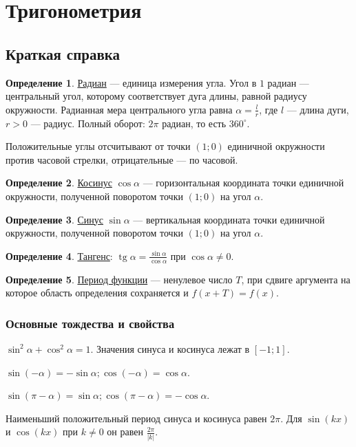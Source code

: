 \documentclass[12pt,a4paper]{article}
\theoremstyle{definition}
\newtheorem{definition}{Определение}[section]
\theoremstyle{plain}
\theoremstyle{remark}
\newcommand{\term}[1]{\uline{#1}}
\begin{document}
\section{Тригонометрия}
\subsection*{Краткая справка}
\begin{definition}\term{Радиан} — единица измерения угла. Угол в \(1\) радиан — центральный угол, которому соответствует дуга длины, равной радиусу окружности. Радианная мера центрального угла равна \(\alpha=\frac{l}{r}\), где \(l\) — длина дуги, \(r>0\) — радиус. Полный оборот: \(2\pi\) радиан, то есть \(360^\circ\).\end{definition}
Положительные углы отсчитывают от точки \((1;0)\) единичной окружности против часовой стрелки, отрицательные — по часовой.
\begin{definition}\term{Косинус} \(\cos\alpha\) — горизонтальная координата точки единичной окружности, полученной поворотом точки \((1;0)\) на угол \(\alpha\).\end{definition}
\begin{definition}\term{Синус} \(\sin\alpha\) — вертикальная координата точки единичной окружности, полученной поворотом точки \((1;0)\) на угол \(\alpha\).\end{definition}
\begin{definition}\term{Тангенс}: \(\operatorname{tg}  \alpha  = \frac{\sin  \alpha }{\cos  \alpha }\) при \(\cos  \alpha  \ne  0\).\end{definition}
\begin{definition}\term{Период функции} — ненулевое число \(T\), при сдвиге аргумента на которое область определения сохраняется и \(f (x + T) = f (x)\).\end{definition}
\subsubsection*{Основные тождества и свойства}
\(\sin ^{2} \alpha  + \cos ^{2} \alpha  = 1\). Значения синуса и косинуса лежат в \([- 1;\allowbreak 1]\).\par
\(\sin  (- \alpha ) = - \sin  \alpha ;\allowbreak \cos  (- \alpha ) = \cos  \alpha \).\par
\(\sin  (\pi  - \alpha ) = \sin  \alpha ;\allowbreak \cos  (\pi  - \alpha ) = - \cos  \alpha \).\par
Наименьший положительный период синуса и косинуса равен \(2 \pi \). Для \(\sin  (kx)\) и \(\cos  (kx)\) при \(k \ne  0\) он равен \(\frac{2 \pi }{| k |}\).\par
\end{document}
